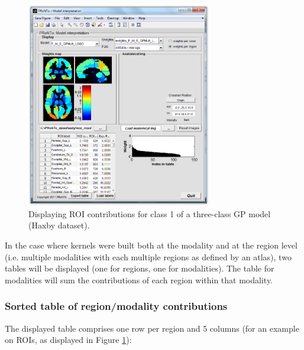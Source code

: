 \begin{figure}[h!]
\begin{center}
\includegraphics[height=9cm]{images/prt_ui_weights_ROI.PNG}
\caption{Displaying ROI contributions for class 1 of a three-class GP model (Haxby dataset).}
\label{fig_prt_ui_weights_ROI}
\end{center}
\end{figure}

In the case where kernels were built both at the modality and at the region level (i.e. multiple modalities with each multiple regions as defined by an atlas), two tables will be displayed (one for regions, one for modalities). The table for modalities will sum the contributions of each region within that modality.

\subsubsection{Sorted table of region/modality contributions}

The displayed table comprises one row per region and 5 columns (for an example on ROIs, as displayed in Figure \ref{fig_prt_ui_weights_ROI}):

